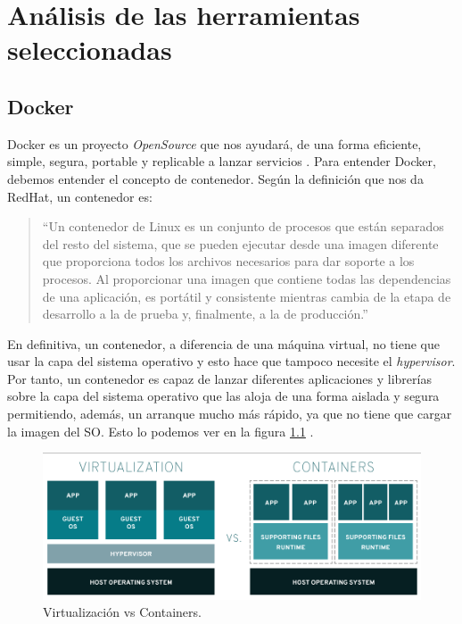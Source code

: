 \chapter{Análisis de las herramientas seleccionadas \label{propuesta}}


\section{Docker\label{Docker}}


Docker es un proyecto \emph{OpenSource} que nos ayudará, de una forma eficiente,
simple, segura, portable y replicable a lanzar servicios
\cite{Dck-5,Dck-6}. Para entender Docker, debemos entender el concepto de
contenedor. Según la definición que nos da RedHat, un contenedor es:

\begin{quote}

  \small ``Un contenedor de Linux es un conjunto de procesos que están
  separados del resto del sistema, que se pueden ejecutar desde una imagen
  diferente que proporciona todos los archivos necesarios para dar soporte
  a los procesos. Al proporcionar una imagen que contiene todas las
  dependencias de una aplicación, es portátil y consistente mientras cambia
  de la etapa de desarrollo a la de prueba y, finalmente, a la de
  producción.''\cite{Dck-7}

\end{quote}

En definitiva, un contenedor, a diferencia de una máquina virtual, no tiene
que usar la capa del sistema operativo y esto hace que tampoco necesite el
{\em hypervisor}. Por tanto, un contenedor es capaz de lanzar diferentes
aplicaciones y librerías sobre la capa del sistema operativo que las aloja
de una forma aislada y segura permitiendo, además, un arranque mucho más
rápido, ya que no tiene que cargar la imagen del SO. Esto lo podemos ver en
la figura \ref{dock-1} \cite{Dck-7}.

\begin{figure}[htp]
\centering
\includegraphics[scale=0.45]{Imagenes/dockervsvm1.png}
\caption{Virtualización vs Containers.}
\label{dock-1}
\end{figure}

